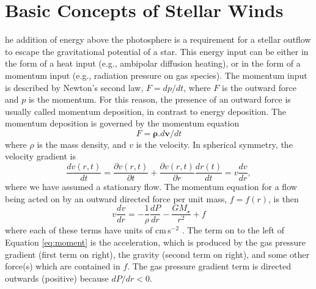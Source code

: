 \section{Basic Concepts of Stellar Winds}\label{sec:1.3}
he addition of energy above the photosphere is a requirement for a stellar outflow to escape the gravitational potential of a star. This energy input can be either in the form of a heat input (e.g., ambipolar diffusion heating), or in the form of a momentum input (e.g., radiation pressure on gas species). The momentum input is described by Newton's second law, $F=dp/dt$, where $F$ is the outward force and $p$ is the momentum. For this reason, the presence of an outward force is usually called momentum deposition, in contrast to energy deposition. The momentum deposition is governed by the momentum equation
\begin{equation}
F=\pmb{\rho}.d\pmb{v}/dt
\end{equation}
where $\rho$ is the mass density, and $v$ is the velocity. In spherical symmetry, the velocity gradient is
\begin{equation}
\dfrac{dv(r,t)}{dt}=\dfrac{\partial v(r,t)}{\partial t}+\dfrac{\partial v(r,t)}{\partial r}\dfrac{dr(t)}{dt}=v\frac{dv}{dr},
\end{equation}
where we have assumed a stationary flow. The momentum equation for a flow being acted on by an outward directed force per unit mass, $f=f(r)$, is then
\begin{equation}\label{eq:moment}
v\frac{dv}{dr}=-\frac{1}{\rho}\frac{dP}{dr}-\frac{GM_{\star}}{r^2}+f
\end{equation}
where each of these terms have units of cm\,s$^{-2}$ \citep[e.g.,][]{lamers_1999}. The term on to the left of Equation \ref{eq:moment} is the acceleration, which is produced by the gas pressure gradient (first term on right), the gravity (second term on right), and some other force(s) which are contained in $f$. The gas pressure gradient term is directed outwards (positive) because $dP/dr < 0$. 

